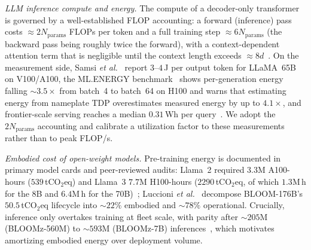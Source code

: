 \documentclass[journal]{IEEEtran}
\begin{document}
\textit{LLM inference compute and energy.} The compute of a decoder-only transformer is governed by
a well-established FLOP accounting: a forward (inference) pass costs $\approx 2N_{\mathrm{params}}$ FLOPs per token and
a full training step $\approx 6N_{\mathrm{params}}$ (the backward pass being roughly twice the forward), with a
context-dependent attention term that is negligible until the context length exceeds
$\approx 8d$~\cite{kaplan2020scaling,deepmind_scaling_book}. On the measurement side, Samsi
\emph{et al.}~\cite{samsi2023words} report $3$--$4$\,J per output token for LLaMA~65B on V100/A100,
the ML.ENERGY benchmark~\cite{mlenergy2025} shows per-generation energy falling $\sim\!3.5\times$
from batch~4 to batch~64 on H100 and warns that estimating energy from nameplate TDP overestimates
measured energy by up to $4.1\times$, and frontier-scale serving reaches a median $0.31$\,Wh per
query~\cite{oviedo2026joule}. We adopt the $2N_{\mathrm{params}}$ accounting and calibrate a utilization factor to
these measurements rather than to peak FLOP/s.

\textit{Embodied cost of open-weight models.} Pre-training energy is documented in primary model
cards and peer-reviewed audits: Llama~2 required $3.3$M A100-hours ($539$\,tCO$_2$eq) and Llama~3
$7.7$M H100-hours ($2290$\,tCO$_2$eq, of which $1.3$M\,h for the 8B and $6.4$M\,h for the
70B)~\cite{touvron2023llama2,llama3card}; Luccioni \emph{et al.}~\cite{luccioni2023bloom} decompose
BLOOM-176B's $50.5$\,tCO$_2$eq lifecycle into $\sim\!22\%$ embodied and $\sim\!78\%$ operational.
Crucially, inference only overtakes training at fleet scale, with parity after $\sim\!205$M
(BLOOMz-560M) to $\sim\!593$M (BLOOMz-7B) inferences~\cite{luccioni2024power}, which motivates
amortizing embodied
energy over deployment volume.
\end{document}
